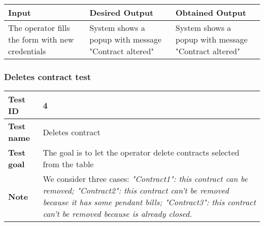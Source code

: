 {{{			\begin{table}[h]
			\begin{tabular}{|p{4cm}|p{5cm}|p{5cm}|}
			\hline
			\centering \vspace{1mm} \bfseries{Input} \vspace{1mm} & \vspace{1mm} \bfseries{Desired Output} \vspace{1mm} & \vspace{1mm} \bfseries{Obtained Output} \vspace{1mm}\\
			\hline
				\vspace{1mm} The operator fills the form with new credentials \vspace{1mm} &
				\vspace{1mm} System shows a popup with message "Contract altered" \vspace{1mm} & 
				\vspace{1mm} System shows a popup with message "Contract altered" \vspace{1mm} \\
			\hline
			\end{tabular}
			\end{table}
		}
		\clearpage

		\subsubsection{Deletes contract test}{
			\begin{table}[h]
			\begin{tabular}{|p{4cm}|p{10cm}|}
			\hline
				\centering \vspace{1mm} \bfseries{Test ID} \vspace{1mm} & 
				\vspace{1mm} 4 \vspace{1mm}\\
			\hline
				\centering \vspace{1mm} \bfseries{Test name} \vspace{1mm} & 
				\vspace{1mm} Deletes contract\vspace{1mm}\\
			\hline
				\centering \vspace{1mm} \bfseries{Test goal} \vspace{1mm} & 
				\vspace{1mm} The goal is to let the operator delete contracts selected from the table\vspace{1mm}\\
			\hline
				\centering \vspace{1mm} \bfseries{Note} \vspace{1mm} & 
				\vspace{1mm} We consider three cases: \itshape{"Contract1"}: this contract can be removed; \itshape{"Contract2"}: this contract can't be removed because it has some pendant bills; \itshape{"Contract3"}: this contract can't be removed because is already closed. \vspace{1mm}\\
			\hline
			\end{tabular}
			\end{table}

}}}
